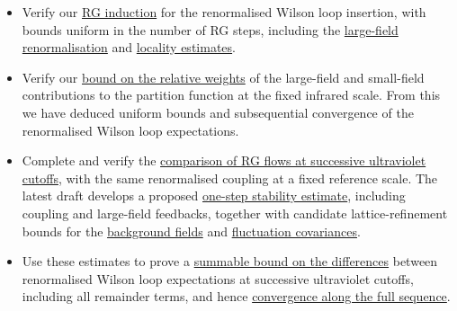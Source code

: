 \documentclass[12pt]{article}
\begin{document}
\begin{itemize}
    \item Verify our \href{https://github.com/MathePhysics/4D_Wilson_Loop_RG/blob/main/drafts/WILSON_IT1_D2_STEP_MAP_2026_10_22.md}{RG induction} for the renormalised Wilson loop insertion, with bounds uniform in the number of RG steps, including the \href{https://github.com/MathePhysics/4D_Wilson_Loop_RG/blob/main/drafts/WILSON_IT1_D26_CLOSURE_2026_10_24.md}{large-field renormalisation} and \href{https://github.com/MathePhysics/4D_Wilson_Loop_RG/blob/main/drafts/WILSON_IT1_D27_CLOSURE_2026_10_26.md}{locality estimates}.
    \item Verify our \href{https://github.com/MathePhysics/4D_Wilson_Loop_RG/blob/main/drafts/WILSON_IT1_CAUCHY_ESTIMATE_2026_10_27.md#11-the-relative-weight-of-the-large-field-terms-derived-replaces-q-unreviewed}{bound on the relative weights} of the large-field and small-field contributions to the partition function at the fixed infrared scale. From this we have deduced uniform bounds and subsequential convergence of the renormalised Wilson loop expectations.
    \item Complete and verify the \href{https://github.com/MathePhysics/4D_Wilson_Loop_RG/blob/main/drafts/WILSON_IT1_CAUCHY_ESTIMATE_2026_10_27.md}{comparison of RG flows at successive ultraviolet cutoffs}, with the same renormalised coupling at a fixed reference scale. The latest draft develops a proposed \href{https://github.com/MathePhysics/4D_Wilson_Loop_RG/blob/main/drafts/WILSON_IT1_CAUCHY_ESTIMATE_2026_10_27.md#8-the-generated-difference-of-one-fluctuation-integral}{one-step stability estimate}, including coupling and large-field feedbacks, together with candidate lattice-refinement bounds for the \href{https://github.com/MathePhysics/4D_Wilson_Loop_RG/blob/main/drafts/WILSON_IT1_CAUCHY_ESTIMATE_2026_10_27.md#9-classical-depth-derived}{background fields} and \href{https://github.com/MathePhysics/4D_Wilson_Loop_RG/blob/main/drafts/WILSON_IT1_CAUCHY_ESTIMATE_2026_10_27.md#10-gaussian-depth-configuration-depth-covariance-half}{fluctuation covariances}.
    \item Use these estimates to prove a \href{https://github.com/MathePhysics/4D_Wilson_Loop_RG/blob/main/drafts/WILSON_IT1_CAUCHY_ESTIMATE_2026_10_27.md#87-the-solution-of-the-recursion-derived}{summable bound on the differences} between renormalised Wilson loop expectations at successive ultraviolet cutoffs, including all remainder terms, and hence \href{https://github.com/MathePhysics/4D_Wilson_Loop_RG/blob/main/drafts/WILSON_IT1_CAUCHY_ESTIMATE_2026_10_27.md#7-what-remains-collected}{convergence along the full sequence}.
\end{itemize}
\end{document}
